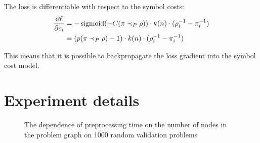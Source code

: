 \documentclass[runningheads]{llncs}
\begin{document}
The loss is differentiable with respect to the symbol costs:
\begin{align*}
\frac{\partial \ell}{\partial c_i}
&= -\operatorname{sigmoid}(-C(\pi \prec_{P} \rho)) \cdot k(n) \cdot (\rho^{-1}_i - \pi^{-1}_i) \\
&= (p(\pi \prec_{P} \rho) - 1) \cdot k(n) \cdot (\rho^{-1}_i - \pi^{-1}_i)
\end{align*}

This means that it is possible to backpropagate the loss gradient into the symbol cost model. 

\section{Experiment details}

\begin{figure}[h]
\caption{The dependence of preprocessing time on the number of nodes in the problem graph on 1000 random validation problems}
\label{fig:preprocessing}
\centering
% 
\end{figure}
\end{document}
